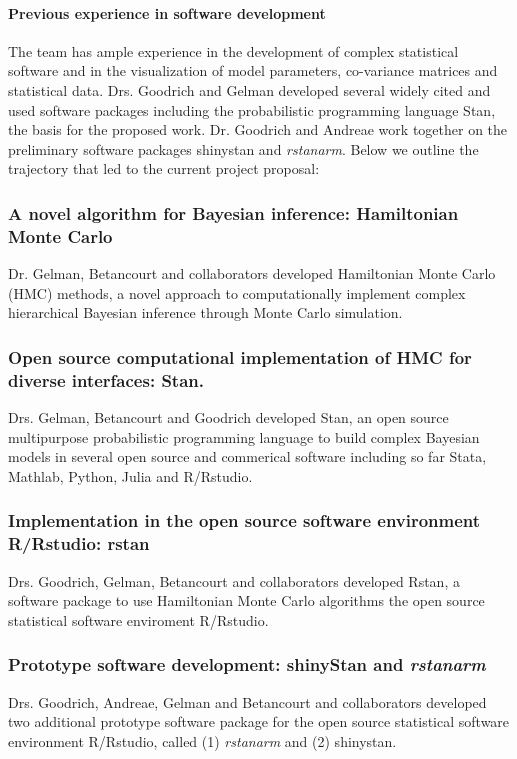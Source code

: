 \documentclass[11pt,notitlepage]{article}
\begin{document}
\paragraph*{Previous experience in software development} 
The team has ample experience in the development of complex statistical software and in the visualization of model parameters, co-variance matrices and statistical data.  Drs. Goodrich and Gelman developed several widely cited and used software packages including the probabilistic programming language Stan\cite{SDT2014}, the basis for the proposed work. Dr. Goodrich and Andreae work together on the preliminary software packages shinystan and \textit{rstanarm}. Below we outline the trajectory that led to the current project proposal:
\newline

\subsubsection*{A novel algorithm for Bayesian inference: Hamiltonian Monte Carlo}
Dr. Gelman, Betancourt and collaborators developed Hamiltonian Monte Carlo (HMC) methods, a novel approach to computationally implement complex hierarchical Bayesian inference through Monte Carlo simulation. 

\subsubsection*{Open source computational implementation of HMC for diverse interfaces: Stan.} Drs. Gelman, Betancourt and Goodrich developed Stan, an open source multipurpose probabilistic programming language to build complex Bayesian models in several open source and commerical software including so far Stata, Mathlab, Python, Julia and R/Rstudio. 
 
\subsubsection*{Implementation in the open source software environment R/Rstudio: rstan} Drs. Goodrich, Gelman, Betancourt and collaborators developed Rstan, a software package to use Hamiltonian Monte Carlo algorithms the open source statistical software enviroment R/Rstudio.
\subsubsection*{Prototype software development: shinyStan and \textit{rstanarm}} Drs. Goodrich, Andreae, Gelman and Betancourt and collaborators developed two additional prototype software package for the open source statistical software environment R/Rstudio, called (1) \textit{rstanarm} and (2) shinystan.
\end{document}
